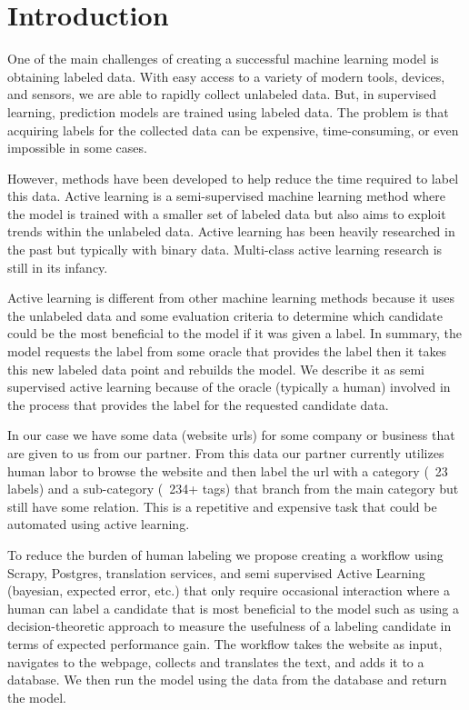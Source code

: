 \chapter*{Introduction}

One of the main challenges of creating a successful machine learning model is obtaining labeled data. With easy access to a variety of modern tools, devices, and sensors, we are able to rapidly collect unlabeled data. But, in supervised learning, prediction models are trained using labeled data. The problem is that acquiring labels for the collected data can be expensive, time-consuming, or even impossible in some cases.  

However, methods have been developed to help reduce the time required to label this data. Active learning is a semi-supervised machine learning method where the model is trained with a smaller set of labeled data but also aims to exploit trends within the unlabeled data. Active learning has been heavily researched in the past but typically with binary data. Multi-class active learning research is still in its infancy. 

Active learning is different from other machine learning methods because it uses the unlabeled data and some evaluation criteria to determine which candidate could be the most beneficial to the model if it was given a label. In summary, the model requests the label from some oracle that provides the label then it takes this new labeled data point and rebuilds the model. We describe it as semi supervised active learning because of the oracle (typically a human) involved in the process that provides the label for the requested candidate data. 

In our case we have some data (website urls) for some company or business that are given to us from our partner. From this data our partner currently utilizes human labor to browse the website and then label the url with a category (~23 labels) and a sub-category (~234+ tags) that branch from the main category but still have some relation. This is a repetitive and expensive task that could be automated using active learning.

To reduce the burden of human labeling we propose creating a workflow using Scrapy, Postgres, translation services, and semi supervised Active Learning (bayesian, expected error, etc.) that only require occasional interaction where a human can label a candidate that is most beneficial to the model such as using a decision-theoretic approach to measure the usefulness of a labeling candidate in terms of expected performance gain. The workflow takes the website as input, navigates to the webpage, collects and translates the text, and adds it to a database. We then run the model using the data from the database and return the model. 



